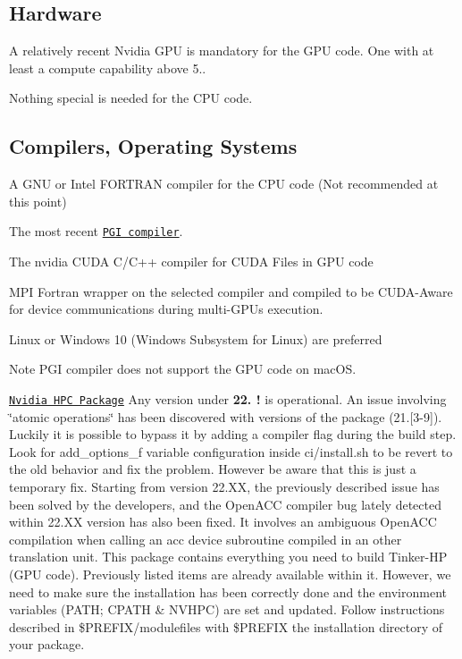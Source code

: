 \subsection*{Hardware}

A relatively recent Nvidia G\-P\-U is mandatory for the G\-P\-U code. One with at least a compute capability above 5..

Nothing special is needed for the C\-P\-U code.

\subsection*{Compilers, Operating Systems}


\begin{DoxyItemize}
\item A G\-N\-U or Intel F\-O\-R\-T\-R\-A\-N compiler for the C\-P\-U code (Not recommended at this point)
\item The most recent \href{https://www.pgroup.com/products/community.htm}{\tt P\-G\-I compiler}.
\item The nvidia C\-U\-D\-A C/\-C++ compiler for C\-U\-D\-A Files in G\-P\-U code
\item M\-P\-I Fortran wrapper on the selected compiler and compiled to be C\-U\-D\-A-\/\-Aware for device communications during multi-\/\-G\-P\-Us execution.
\item Linux or Windows 10 (Windows Subsystem for Linux) are preferred
\end{DoxyItemize}

\begin{DoxyNote}{Note}
P\-G\-I compiler does not support the G\-P\-U code on mac\-O\-S.
\end{DoxyNote}

\begin{DoxyItemize}
\item \href{https://developer.nvidia.com/nvidia-hpc-sdk-releases}{\tt Nvidia H\-P\-C Package} Any version under {\bfseries 22. !} is operational. An issue involving \char`\"{}atomic operations\char`\"{} has been discovered with versions of the package (21.\mbox{[}3-\/9\mbox{]}). Luckily it is possible to bypass it by adding a compiler flag during the build step. Look for {\ttfamily add\-\_\-options\-\_\-f} variable configuration inside {\ttfamily ci/install.\-sh} to be revert to the old behavior and fix the problem. However be aware that this is just a temporary fix. Starting from version 22.\-X\-X, the previously described issue has been solved by the developers, and the Open\-A\-C\-C compiler bug lately detected within 22.\-X\-X version has also been fixed. It involves an ambiguous Open\-A\-C\-C compilation when calling an acc device subroutine compiled in an other translation unit. This package contains everything you need to build Tinker-\/\-H\-P (G\-P\-U code). Previously listed items are already available within it. However, we need to make sure the installation has been correctly done and the environment variables (P\-A\-T\-H; C\-P\-A\-T\-H \& N\-V\-H\-P\-C) are set and updated. Follow instructions described in {\ttfamily \$\-P\-R\-E\-F\-I\-X/modulefiles} with {\ttfamily \$\-P\-R\-E\-F\-I\-X} the installation directory of your package.
\end{DoxyItemize}

